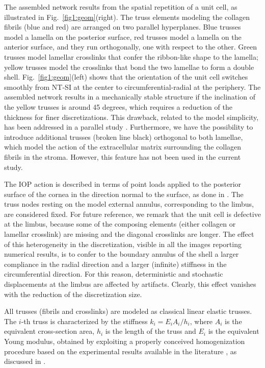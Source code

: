 \documentclass[preprint,12pt]{elsarticle}
\begin{document}
The assembled network results from the spatial repetition of a unit cell, as illustrated in Fig.~\ref{fig1:geom}(right). The truss elements modeling the collagen fibrils (blue and red) are arranged on two parallel hyperplanes. Blue trusses model a lamella on the posterior surface, red trusses model a lamella on the anterior surface, and they run orthogonally, one with respect to the other. Green trusses model lamellar crosslinks that confer the ribbon-like shape to the lamella; yellow trusses model the crosslinks that bond the two lamellae to form a double shell. Fig.~\ref{fig1:geom}(left) shows that the orientation of the unit cell switches smoothly from NT-SI at the center to circumferential-radial at the periphery. The assembled network results in a mechanically stable structure if the inclination of the yellow trusses is around 45 degrees, which requires a reduction of the thickness for finer discretizations. This drawback, related to the model simplicity, has been addressed in a parallel study \cite{koery:2023}. Furthermore, we have the possibility to introduce additional trusses (broken line black) orthogonal to both lamellae, which model the action of the extracellular matrix surrounding the collagen fibrils in the stroma. However, this feature has not been used in the current study.

The IOP action is described in terms of point loads applied to the posterior surface of the cornea in the direction normal to the surface, as done in \cite{pandolfi:2019}. The truss nodes resting on the model external annulus, corresponding to the limbus, are considered fixed. For future reference, we remark that the unit cell is defective at the limbus, because some of the composing elements (either collagen or lamellar crosslink) are missing and the diagonal crosslinks are longer. The effect of this heterogeneity in the discretization, visible in all the images reporting numerical results, is to confer to the boundary annulus of the shell a larger compliance in the radial direction and a larger (infinite) stiffness in the circumferential direction. For this reason, deterministic and stochastic displacements at the limbus are affected by artifacts. Clearly, this effect vanishes with the reduction of the discretization size. 

All trusses (fibrils and crosslinks) are modeled as classical linear elastic trusses. The $i$-th truss is characterized by the stiffness $k_i = E_i A_i/h_i$, where  $A_i$ is the equivalent cross-section area, $h_i$ is the length of the truss and $E_i$ is the equivalent Young modulus, obtained by exploiting a properly conceived homogenization procedure based on the experimental results available in the literature \cite{marino:2013, gyi:1988, scott:2003}, as discussed in \cite{pandolfi:2019}. 
\end{document}

